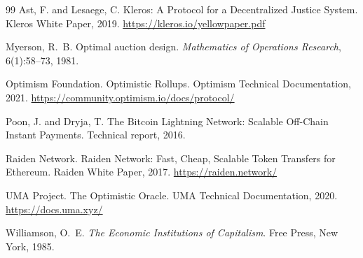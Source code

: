 \documentclass[11pt,a4paper]{article}
\theoremstyle{definition}
\theoremstyle{remark}
\begin{document}
\begin{thebibliography}{99}
Ast, F. and Lesaege, C.
\newblock Kleros: A Protocol for a Decentralized Justice System.
\newblock Kleros White Paper, 2019.
\newblock \url{https://kleros.io/yellowpaper.pdf}

Myerson, R.~B.
\newblock Optimal auction design.
\newblock \emph{Mathematics of Operations Research}, 6(1):58--73, 1981.

Optimism Foundation.
\newblock Optimistic Rollups.
\newblock Optimism Technical Documentation, 2021.
\newblock \url{https://community.optimism.io/docs/protocol/}

Poon, J. and Dryja, T.
\newblock The Bitcoin Lightning Network: Scalable Off-Chain Instant Payments.
\newblock Technical report, 2016.

Raiden Network.
\newblock Raiden Network: Fast, Cheap, Scalable Token Transfers for Ethereum.
\newblock Raiden White Paper, 2017.
\newblock \url{https://raiden.network/}

UMA Project.
\newblock The Optimistic Oracle.
\newblock UMA Technical Documentation, 2020.
\newblock \url{https://docs.uma.xyz/}

Williamson, O.~E.
\newblock \emph{The Economic Institutions of Capitalism}.
\newblock Free Press, New York, 1985.

\end{thebibliography}
\end{document}
